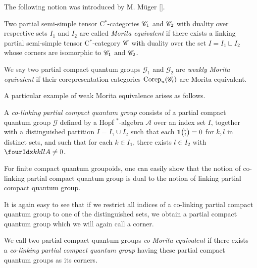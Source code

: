 The following notion was introduced by M. M\"{u}ger []. %

\begin{Def} Two partial semi-simple tensor C$^*$-categories $\mathscr{C}_1$ and $\mathscr{C}_2$ with duality over respective sets $I_1$ and $I_2$ are called \emph{Morita equivalent} if there exists a linking partial semi-simple tensor C$^*$-category $\mathscr{C}$ with duality over the set $I=I_1\sqcup I_2$ whose corners are isomorphic to $\mathscr{C}_1$ and $\mathscr{C}_2$.

We say two partial compact quantum groups $\mathscr{G}_1$ and $\mathscr{G}_2$ are \emph{weakly Morita equivalent} if their corepresentation categories $\mathrm{Corep}_u(\mathscr{G}_i)$ are Morita equivalent. 
\end{Def} 

A particular example of weak Morita equivalence arises as follows.

\begin{Def} A \emph{co-linking partial compact quantum group} consists of a partial compact quantum group $\mathscr{G}$ defined by a Hopf $^*$-algebra $\mathscr{A}$ over an index set $I$, together with a distinguished partition $I = I_1\cup I_2$ such that each $\mathbf{1}{\tiny {\begin{pmatrix} k\\l\end{pmatrix}}}=0$ for $k,l$ in distinct sets, and such that for each $k\in I_1$, there exists $l\in I_2$ with $\Gr{A}{k}{l}{k}{l}\neq 0$.  
\end{Def} 

\begin{Rem} For finite compact quantum groupoids, one can easily show that the notion of co-linking partial compact quantum group is dual to the notion of linking partial compact quantum group.\end{Rem}

It is again easy to see that if we restrict all indices of a co-linking partial compact quantum group to one of the distinguished sets, we obtain a partial compact quantum group which we will again call a corner.

\begin{Def} We call two partial compact quantum groups \emph{co-Morita equivalent} if there exists a \emph{co-linking partial compact quantum group} having these partial compact quantum groups as its corners.
\end{Def}

